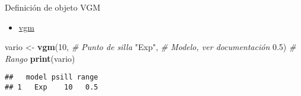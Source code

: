 \documentclass[ignorenonframetext,]{beamer}
\newenvironment{Shaded}{\begin{snugshade}}{\end{snugshade}}
\newcommand{\CommentTok}[1]{\textcolor[rgb]{0.56,0.35,0.01}{\textit{#1}}}
\newcommand{\DecValTok}[1]{\textcolor[rgb]{0.00,0.00,0.81}{#1}}
\newcommand{\FloatTok}[1]{\textcolor[rgb]{0.00,0.00,0.81}{#1}}
\newcommand{\KeywordTok}[1]{\textcolor[rgb]{0.13,0.29,0.53}{\textbf{#1}}}
\newcommand{\NormalTok}[1]{#1}
\newcommand{\StringTok}[1]{\textcolor[rgb]{0.31,0.60,0.02}{#1}}
\providecommand{\tightlist}{%
  \setlength{\itemsep}{0pt}\setlength{\parskip}{0pt}}
\begin{document}
\begin{frame}[fragile]{Definición de objeto VGM}
\protect\hypertarget{definiciuxf3n-de-objeto-vgm}{}

\begin{itemize}
\tightlist
\item
  \href{https://cran.r-project.org/web/packages/gstat/gstat.pdf\#page=73}{vgm}
\end{itemize}

\begin{Shaded}
\begin{Highlighting}[]
\NormalTok{vario <-}\StringTok{ }\KeywordTok{vgm}\NormalTok{(}\DecValTok{10}\NormalTok{, }\CommentTok{# Punto de silla}
             \StringTok{"Exp"}\NormalTok{, }\CommentTok{# Modelo, ver documentación}
             \FloatTok{0.5}\NormalTok{)  }\CommentTok{# Rango}
\KeywordTok{print}\NormalTok{(vario)}
\end{Highlighting}
\end{Shaded}

\begin{verbatim}
##   model psill range
## 1   Exp    10   0.5
\end{verbatim}

\end{frame}
\end{document}
